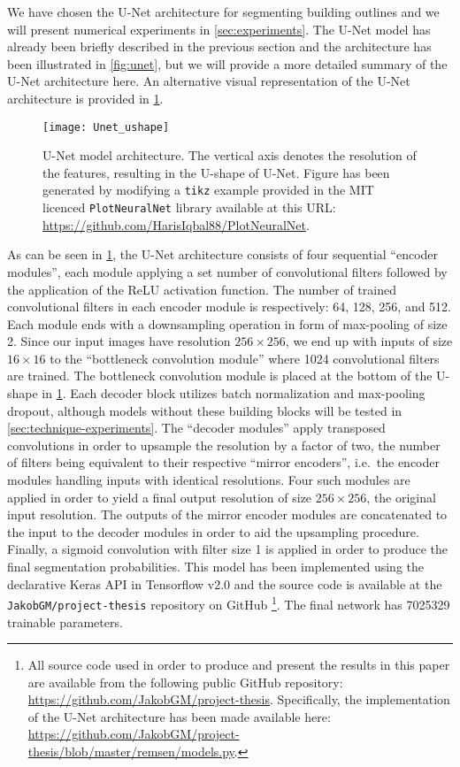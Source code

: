 We have chosen the U-Net architecture for segmenting building outlines and we will present numerical experiments in \cref{sec:experiments}.
The U-Net model has already been briefly described in the previous section and the architecture has been illustrated in \cref{fig:unet}, but we will provide a more detailed summary of the U-Net architecture here.
An alternative visual representation of the U-Net architecture is provided in \cref{fig:unet2}.

\begin{figure}[H]
  \centering
  \texttt{[image: Unet\_ushape]}
  \caption{%
    U-Net model architecture.
    The vertical axis denotes the resolution of the features, resulting in the U-shape of U-Net.
    Figure has been generated by modifying a \texttt{tikz} example provided in the MIT licenced \texttt{PlotNeuralNet} library available at this URL:\@
    \protect\url{https://github.com/HarisIqbal88/PlotNeuralNet}.
  }%
  \label{fig:unet2}
\end{figure}

As can be seen in \cref{fig:unet2}, the U-Net architecture consists of four sequential \enquote{encoder modules}, each module applying a set number of convolutional filters followed by the application of the ReLU activation function.
The number of trained convolutional filters in each encoder module is respectively: 64, 128, 256, and 512.
Each module ends with a downsampling operation in form of max-pooling of size 2.
Since our input images have resolution $256 \times 256$, we end up with inputs of size $16 \times 16$ to the \enquote{bottleneck convolution module} where 1024 convolutional filters are trained.
The bottleneck convolution module is placed at the bottom of the U-shape in \cref{fig:unet2}.
Each decoder block utilizes batch normalization and max-pooling dropout, although models without these building blocks will be tested in \cref{sec:technique-experiments}.
The \enquote{decoder modules} apply transposed convolutions in order to upsample the resolution by a factor of two, the number of filters being equivalent to their respective \enquote{mirror encoders}, i.e.\ the encoder modules handling inputs with identical resolutions.
Four such modules are applied in order to yield a final output resolution of size $256 \times 256$, the original input resolution.
The outputs of the mirror encoder modules are concatenated to the input to the decoder modules in order to aid the upsampling procedure.
Finally, a sigmoid convolution with filter size \num{1} is applied in order to produce the final segmentation probabilities.
This model has been implemented using the declarative Keras API in Tensorflow v2.0 and the source code is available at the \texttt{JakobGM/project-thesis} repository on GitHub%
\footnote{%
  All source code used in order to produce and present the results in this paper are available from the following public GitHub repository: \url{https://github.com/JakobGM/project-thesis}.
  Specifically, the implementation of the U-Net architecture has been made available here: \url{https://github.com/JakobGM/project-thesis/blob/master/remsen/models.py}.
}.
The final network has \num{7025329} trainable parameters.
